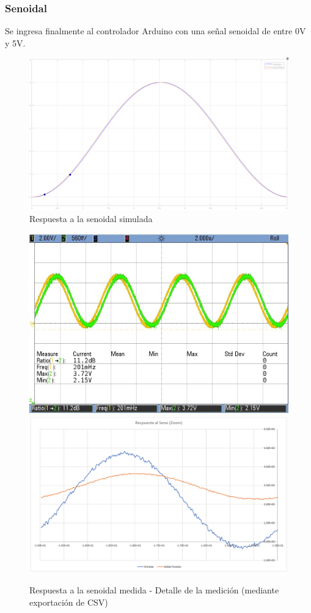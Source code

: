 \documentclass{article}
\begin{document}
\newpage

\subsubsection{Senoidal}

Se ingresa finalmente al controlador Arduino con una señal senoidal de entre 0V y 5V.

\begin{figure}[H]
\centering
\includegraphics[width=0.7\linewidth]{../Images/SenoSimulado.png}
\caption{Respuesta a la senoidal simulada}
\end{figure}

\begin{figure}[H]
\centering
\includegraphics[width=0.45\linewidth]{../Mediciones/servo_seno.jpeg}
\includegraphics[width=0.45\linewidth]{../Images/SenoMedido.png}
\caption{Respuesta a la senoidal medida - Detalle de la medición (mediante exportación de CSV)}
\end{figure}
\end{document}
